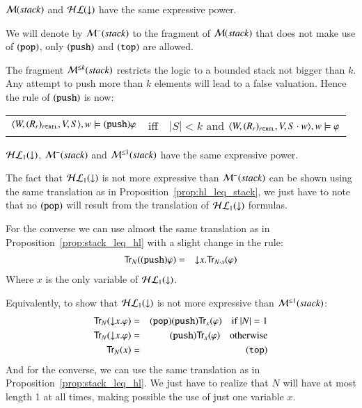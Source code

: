 \begin{cor}
$\mathcal{M}(stack)$ and $\mathcal{HL}({\downarrow})$ have the same expressive power.
\end{cor}

We will denote by $\mathcal{M}^-(stack)$ to the fragment of $\mathcal{M}(stack)$ that does not
make use of ${\tt (pop)}$, only ${\tt (push)}$ and ${\tt (top)}$ are allowed.

The fragment $\mathcal{M}^{\leq k}(stack)$ restricts the logic to a bounded stack
not bigger than $k$. Any attempt to push more than $k$ elements will
lead to a false valuation. Hence the rule of ${\tt (push)}$ is now:
\begin{center}
\begin{tabular}{rcl}
$\langle W,(R_r)_{r \in \textsc{rel}},V,S \rangle,w \models {\tt (push)} \varphi$ &
 iff & $|S|<k$ and $\langle W,(R_r)_{r \in \textsc{rel}},V,S\cdot w \rangle,w \models \varphi$
\end{tabular}
\end{center}

\begin{pro}
$\mathcal{HL}_1({\downarrow})$, $\mathcal{M}^-(stack)$ and $\mathcal{M}^{\leq 1}(stack)$ have the same expressive
power.
\end{pro}
\begin{pf}
The fact that $\mathcal{HL}_1({\downarrow})$ is not more expressive than $\mathcal{M}^-(stack)$ can
be shown using the same translation as in
Proposition~\ref{prop:hl_leq_stack}, we just have to note that no
${\tt (pop)}$ will result from the translation of $\mathcal{HL}_1({\downarrow})$ formulas.

For the converse we can use almost the same translation as in
Proposition~\ref{prop:stack_leq_hl} with a slight change in the
rule:
\begin{eqnarray*}
{\sf Tr}_N({\tt (push)} \varphi) & = & {\downarrow} x. {\sf Tr}_{N\cdot x}(\varphi)
\end{eqnarray*}
Where $x$ is the only variable of $\mathcal{HL}_1({\downarrow})$.

\smallskip

Equivalently, to show that $\mathcal{HL}_1({\downarrow})$ is not more expressive than
$\mathcal{M}^{\leq 1}(stack)$:
\begin{eqnarray*}
{\sf Tr}_N({\downarrow} x.\varphi) & = & {\tt (pop)}{\tt (push)}{\sf Tr}_{x}(\varphi) \quad \textrm{if } |N|=1\\
{\sf Tr}_N({\downarrow} x.\varphi) & = & {\tt (push)}{\sf Tr}_{x}(\varphi) \quad \textrm{otherwise}\\
{\sf Tr}_N(x) & = & {\tt (top)}
\end{eqnarray*}
And for the converse, we can use the same translation as in
Proposition~\ref{prop:stack_leq_hl}. We just have to realize that
$N$ will have at most length 1 at all times, making possible the use
of just one variable $x$.
\end{pf}
